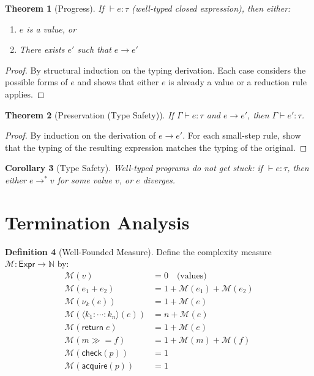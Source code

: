 \documentclass[11pt,twoside,openright]{book}
\theoremstyle{definition}
\newtheorem{definition}{Definition}[chapter]
\theoremstyle{plain}
\newtheorem{theorem}[definition]{Theorem}
\newtheorem{corollary}[definition]{Corollary}
\theoremstyle{remark}
\newcommand{\N}{\mathbb{N}}
\newcommand{\noe}[1]{\nu_{#1}}
\newcommand{\rpmret}{\mathsf{return}}
\newcommand{\rpmbind}{\mathbin{\gg\!=}}
\newcommand{\Expr}{\mathsf{Expr}}
\newcommand{\smallstep}{\to}
\begin{document}
\begin{theorem}[Progress]
\label{thm:progress}
If $\vdash e : \tau$ (well-typed closed expression), then either:
\begin{enumerate}
\item $e$ is a value, or
\item There exists $e'$ such that $e \smallstep e'$
\end{enumerate}
\end{theorem}

\begin{proof}
By structural induction on the typing derivation. Each case considers the possible forms of $e$ and shows that either $e$ is already a value or a reduction rule applies.
\end{proof}

\begin{theorem}[Preservation (Type Safety)]
\label{thm:preservation}
If $\Gamma \vdash e : \tau$ and $e \smallstep e'$, then $\Gamma \vdash e' : \tau$.
\end{theorem}

\begin{proof}
By induction on the derivation of $e \smallstep e'$. For each small-step rule, show that the typing of the resulting expression matches the typing of the original.
\end{proof}

\begin{corollary}[Type Safety]
\label{cor:type-safety}
Well-typed programs do not get stuck: if $\vdash e : \tau$, then either $e \smallstep^* v$ for some value $v$, or $e$ diverges.
\end{corollary}

\section{Termination Analysis}

\begin{definition}[Well-Founded Measure]
\label{def:termination-measure}
Define the complexity measure $\mathcal{M} : \Expr \to \N$ by:
\begin{align}
\mathcal{M}(v) &= 0 \quad \text{(values)} \\
\mathcal{M}(e_1 + e_2) &= 1 + \mathcal{M}(e_1) + \mathcal{M}(e_2) \\
\mathcal{M}(\noe{k}(e)) &= 1 + \mathcal{M}(e) \\
\mathcal{M}(\langle k_1 : \cdots : k_n \rangle(e)) &= n + \mathcal{M}(e) \\
\mathcal{M}(\rpmret\; e) &= 1 + \mathcal{M}(e) \\
\mathcal{M}(m \rpmbind f) &= 1 + \mathcal{M}(m) + \mathcal{M}(f) \\
\mathcal{M}(\mathsf{check}(p)) &= 1 \\
\mathcal{M}(\mathsf{acquire}(p)) &= 1
\end{align}
\end{definition}
\end{document}
